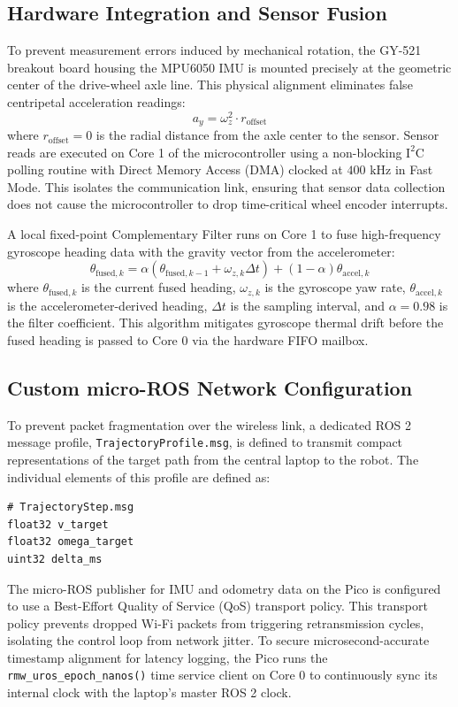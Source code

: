 \documentclass[a4paper,twoside,12pt]{report}
\begin{document}
\subsection{Hardware Integration and Sensor Fusion}

To prevent measurement errors induced by mechanical rotation, the GY-521 breakout board housing the MPU6050 IMU is mounted precisely at the geometric center of the drive-wheel axle line. This physical alignment eliminates false centripetal acceleration readings:
\begin{equation}
a_y = \omega_z^2 \cdot r_{\text{offset}}
\label{eq:centripetal}
\end{equation}
where $r_{\text{offset}} = 0$ is the radial distance from the axle center to the sensor. Sensor reads are executed on Core 1 of the microcontroller using a non-blocking $\text{I}^2\text{C}$ polling routine with Direct Memory Access (DMA) clocked at $400\text{ kHz}$ in Fast Mode. This isolates the communication link, ensuring that sensor data collection does not cause the microcontroller to drop time-critical wheel encoder interrupts.

A local fixed-point Complementary Filter runs on Core 1 to fuse high-frequency gyroscope heading data with the gravity vector from the accelerometer:
\begin{equation}
\theta_{\text{fused}, k} = \alpha (\theta_{\text{fused}, k-1} + \omega_{z, k} \Delta t) + (1 - \alpha) \theta_{\text{accel}, k}
\label{eq:complementary_filter}
\end{equation}
where $\theta_{\text{fused}, k}$ is the current fused heading, $\omega_{z, k}$ is the gyroscope yaw rate, $\theta_{\text{accel}, k}$ is the accelerometer-derived heading, $\Delta t$ is the sampling interval, and $\alpha = 0.98$ is the filter coefficient. This algorithm mitigates gyroscope thermal drift before the fused heading is passed to Core 0 via the hardware FIFO mailbox.

\subsection{Custom micro-ROS Network Configuration}

To prevent packet fragmentation over the wireless link, a dedicated ROS 2 message profile, \texttt{TrajectoryProfile.msg}, is defined to transmit compact representations of the target path from the central laptop to the robot. The individual elements of this profile are defined as:
\begin{verbatim}
# TrajectoryStep.msg
float32 v_target
float32 omega_target
uint32 delta_ms
\end{verbatim}
The micro-ROS publisher for IMU and odometry data on the Pico is configured to use a Best-Effort Quality of Service (QoS) transport policy. This transport policy prevents dropped Wi-Fi packets from triggering retransmission cycles, isolating the control loop from network jitter. To secure microsecond-accurate timestamp alignment for latency logging, the Pico runs the \texttt{rmw\_uros\_epoch\_nanos()} time service client on Core 0 to continuously sync its internal clock with the laptop's master ROS 2 clock.
\end{document}
